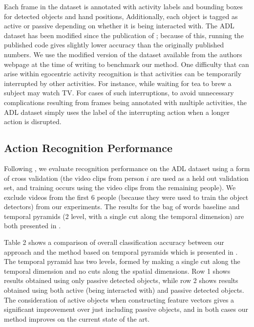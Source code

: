 \documentclass{bmvc2k}
\begin{document}
	Each frame in the dataset
	is annotated with activity labels and bounding boxes for detected objects and hand positions, 
	Additionally, each object is tagged as active or passive depending
	on whether it is being interacted with.
	The ADL dataset has been modified since the publication of
	\cite{Ramanan12}; because of this, running the published code gives
	slightly lower accuracy than the originally published numbers. We use the
  modified version of the dataset available from the authors webpage at the time of writing to
  benchmark our method. One difficulty that can arise within egocentric
  activity recognition is that activities can be temporarily interrupted by
  other activities. For instance, while waiting for tea to brew a subject
  may watch TV. For cases of such interruptions, to avoid unnecessary
  complications resulting from frames being annotated with multiple
  activities, the ADL dataset simply uses the label of the interrupting
  action when a longer action is disrupted.
	
  
  \subsection{Action Recognition Performance}
  Following \cite{Ramanan12}, we evaluate recognition performance on the ADL
  dataset using a form of cross
	validation (the video clips from person $i$ are used as a held out validation set, and
	training occurs using the video clips from the remaining people).
  We exclude videos from the first 6 people
  (because they were used to train the object detectors) from our
  experiments.
  The results for the bag of words baseline and temporal pyramids (2 level, with
  a single cut along the temporal dimension) are both presented in
  \cite{Ramanan12}.
  

	  Table 2 shows a comparison of overall classification accuracy between our
  approach and the method based on temporal pyramids which is
  presented in \cite{Ramanan12}. The temporal pyramid
  has two levels, formed by making a single cut along the temporal
  dimension and no cuts along the spatial dimensions.
  Row 1 shows results
  obtained using only passive detected objects, while row 2 shows results obtained
  using both active (being interacted with) and passive detected objects.
  The consideration of active objects when constructing feature vectors
  gives a significant improvement over just including passive objects, and
  in both cases our method improves on the current state of the art.
\end{document}
